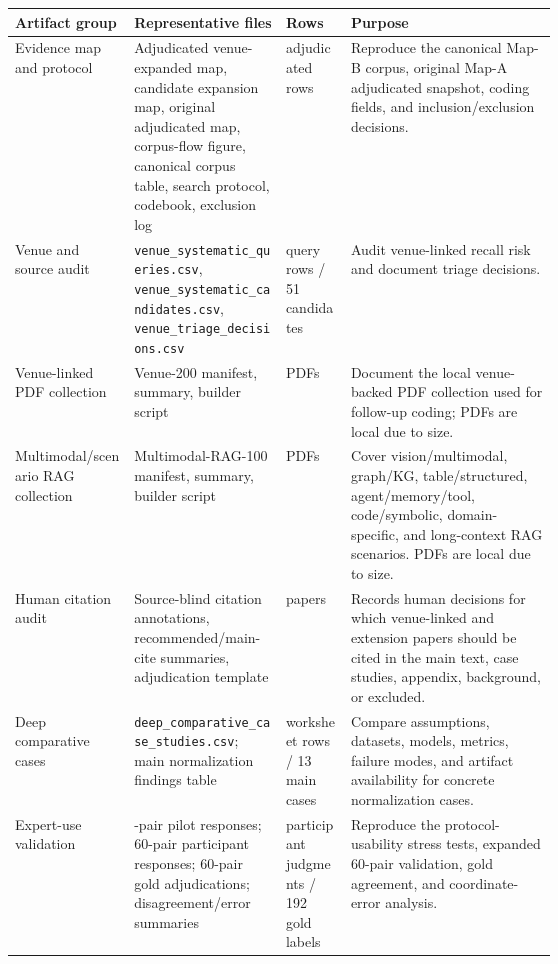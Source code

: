 \documentclass[11pt]{article}
\begin{document}
\clearpage
\begin{table}[t]
\centering
\scriptsize
\renewcommand{\arraystretch}{0.9}
\begin{tabularx}{\linewidth}{>{\raggedright\arraybackslash}p{0.22\linewidth}>{\raggedright\arraybackslash}p{0.29\linewidth}>{\raggedright\arraybackslash}p{0.12\linewidth}X}
\toprule
\textbf{Artifact group} & \textbf{Representative files} & \textbf{Rows} & \textbf{Purpose} \\
\midrule
Evidence map and protocol & Adjudicated venue-expanded map, candidate expansion map, original adjudicated map, corpus-flow figure, canonical corpus table, search protocol, codebook, exclusion log & 342 adjudicated rows & Reproduce the canonical Map-B corpus, original Map-A adjudicated snapshot, coding fields, and inclusion/exclusion decisions. \\
Venue and source audit & \texttt{venue\_systematic\_queries.csv}, \texttt{venue\_systematic\_candidates.csv}, \texttt{venue\_triage\_decisions.csv} & 31 query rows / 51 candidates & Audit venue-linked recall risk and document triage decisions. \\
Venue-linked PDF collection & Venue-200 manifest, summary, builder script & 200 PDFs & Document the local venue-backed PDF collection used for follow-up coding; PDFs are local due to size. \\
Multimodal/scenario RAG collection & Multimodal-RAG-100 manifest, summary, builder script & 100 PDFs & Cover vision/multimodal, graph/KG, table/structured, agent/memory/tool, code/symbolic, domain-specific, and long-context RAG scenarios. PDFs are local due to size. \\
Human citation audit & Source-blind citation annotations, recommended/main-cite summaries, adjudication template & 300 papers & Records human decisions for which venue-linked and extension papers should be cited in the main text, case studies, appendix, background, or excluded. \\
Deep comparative cases & \texttt{deep\_comparative\_case\_studies.csv}; main normalization findings table & 26 worksheet rows / 13 main cases & Compare assumptions, datasets, models, metrics, failure modes, and artifact availability for concrete normalization cases. \\
Expert-use validation & 12-pair pilot responses; 60-pair participant responses; 60-pair gold adjudications; disagreement/error summaries & 720 participant judgments / 192 gold labels & Reproduce the protocol-usability stress tests, expanded 60-pair validation, gold agreement, and coordinate-error analysis. \\

\end{tabularx}
\end{table}
\end{document}
